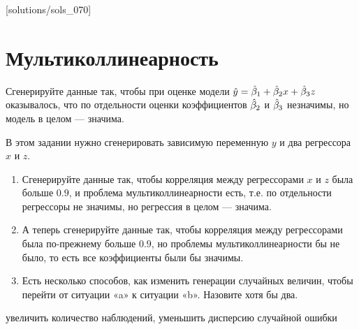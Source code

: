 [solutions/sols_070]

\chapter{Мультиколлинеарность}


\begin{problem}
Сгенерируйте данные так, чтобы при оценке модели $\hat{y}=\hat{\beta}_1+\hat{\beta}_2x+\hat{\beta}_3z$ оказывалось, что по отдельности оценки коэффициентов $\hat{\beta}_2$ и $\hat{\beta}_3$ незначимы, но модель в целом — значима.

\begin{sol}
\end{sol}
\end{problem}


\begin{problem}
В этом задании нужно сгенерировать зависимую переменную $y$ и два регрессора $x$ и $z$.
\begin{enumerate}
\item Сгенерируйте данные так, чтобы корреляция между регрессорами $x$ и $z$ была больше $0.9$, и проблема мультиколлинеарности есть, т.е. по отдельности регрессоры не значимы, но регрессия в целом — значима.
\item А теперь сгенерируйте данные так, чтобы корреляция между регрессорами была по-прежнему больше $0.9$, но проблемы мультиколлинеарности бы не было, то есть все коэффициенты были бы значимы.
\item Есть несколько способов, как изменить генерации случайных величин, чтобы перейти от ситуации «a» к ситуации «b». Назовите хотя бы два.
\end{enumerate}

\begin{sol}
увеличить количество наблюдений, уменьшить дисперсию случайной ошибки
\end{sol}
\end{problem}




